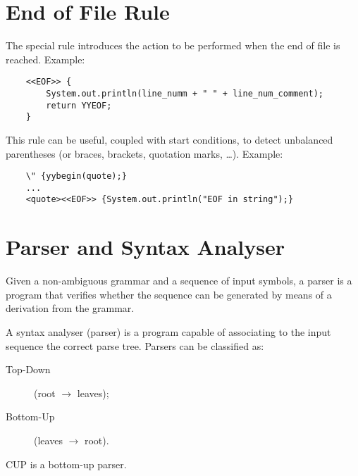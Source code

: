 \section{End of File Rule}
The special rule  introduces the action to be performed when the end of file is reached.
Example:
\begin{lstlisting}
	<<EOF>> {
		System.out.println(line_numm + " " + line_num_comment);
		return YYEOF;
	}
\end{lstlisting}
This rule can be useful, coupled with start conditions, to detect unbalanced parentheses (or braces, brackets, quotation marks, \ldots).
Example:
\begin{lstlisting}
	\" {yybegin(quote);}
	...
	<quote><<EOF>> {System.out.println("EOF in string");}
\end{lstlisting}

\section{Parser and Syntax Analyser}
Given a non-ambiguous grammar and a sequence of input symbols, a parser is a program that verifies whether the sequence can be generated by means of a derivation from the grammar.

A syntax analyser (parser) is a program capable of associating to the input sequence the correct parse tree.
Parsers can be classified as:
\begin{description}
	\item[Top-Down] (root $\to$ leaves);
	\item[Bottom-Up] (leaves $\to$ root).
\end{description}
CUP is a bottom-up parser.